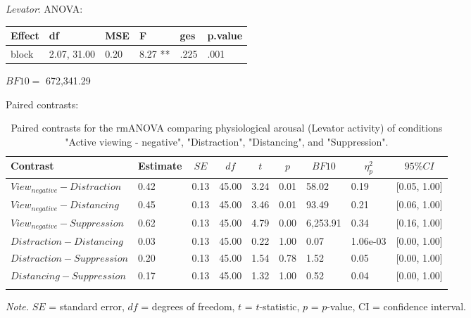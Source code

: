 \documentclass[
  english,
  man,floatsintext]{apa6}
\begin{document}
\emph{Levator}:
ANOVA:

\begin{tabular}{l|l|l|l|l|l}
\hline
Effect & df & MSE & F & ges & p.value\\
\hline
block & 2.07, 31.00 & 0.20 & 8.27 ** & .225 & .001\\
\hline
\end{tabular}

\(BF10=\) 672,341.29

Paired contrasts:

\begin{table}[H]

\begin{center}
\begin{threeparttable}

\caption{\label{tab:unnamed-chunk-8}Paired contrasts for the rmANOVA comparing physiological arousal (Levator activity) of conditions "Active viewing - negative", "Distraction", "Distancing", and "Suppression".}

\begin{tabular}{lllllllll}
\toprule
Contrast & \multicolumn{1}{c}{Estimate} & \multicolumn{1}{c}{$SE$} & \multicolumn{1}{c}{$df$} & \multicolumn{1}{c}{$t$} & \multicolumn{1}{c}{$p$} & \multicolumn{1}{c}{$BF10$} & \multicolumn{1}{c}{$\eta_{p}^{2}$} & \multicolumn{1}{c}{$95\% CI$}\\
\midrule
$View_{negative} - Distraction$ & 0.42 & 0.13 & 45.00 & 3.24 & 0.01 & 58.02 & 0.19 & {}[0.05, 1.00]\\
$View_{negative} - Distancing$ & 0.45 & 0.13 & 45.00 & 3.46 & 0.01 & 93.49 & 0.21 & {}[0.06, 1.00]\\
$View_{negative} - Suppression$ & 0.62 & 0.13 & 45.00 & 4.79 & 0.00 & 6,253.91 & 0.34 & {}[0.16, 1.00]\\
$Distraction - Distancing$ & 0.03 & 0.13 & 45.00 & 0.22 & 1.00 & 0.07 & 1.06e-03 & {}[0.00, 1.00]\\
$Distraction - Suppression$ & 0.20 & 0.13 & 45.00 & 1.54 & 0.78 & 1.52 & 0.05 & {}[0.00, 1.00]\\
$Distancing - Suppression$ & 0.17 & 0.13 & 45.00 & 1.32 & 1.00 & 0.52 & 0.04 & {}[0.00, 1.00]\\
\bottomrule
\addlinespace
\end{tabular}

\begin{tablenotes}[para]
\normalsize{\textit{Note.} $SE$ = standard error, $df$ = degrees of freedom, $t$ = $t$-statistic, $p$ = $p$-value, CI = confidence interval.}
\end{tablenotes}

\end{threeparttable}
\end{center}

\end{table}
\end{document}

